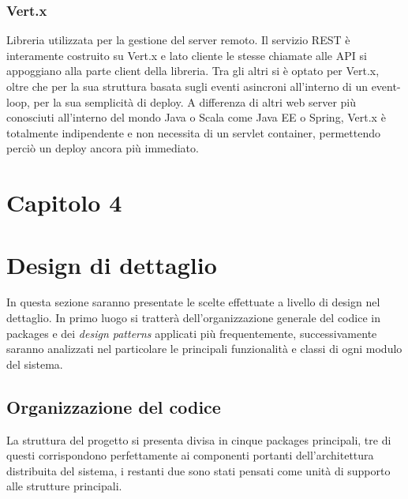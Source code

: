 	 \subsubsection{Vert.x}\label{subsub:tecnologie:vert.x}
	  Libreria utilizzata per la gestione del server remoto. Il servizio REST è interamente costruito su Vert.x e lato cliente le stesse chiamate alle API si appoggiano alla parte client della libreria.
	  Tra gli altri si è optato per Vert.x, oltre che per la sua struttura basata sugli eventi asincroni all'interno di un event-loop, per la sua semplicità di deploy. A differenza di altri web server più conosciuti all'interno del mondo Java o Scala come Java EE o Spring, Vert.x è totalmente
	  indipendente e non necessita di un servlet container, permettendo perciò un deploy ancora più immediato.
        \clearpage
        \setcounter{figure}{0}
        
\section*{\Huge {\textbf Capitolo 4}\label{chapter4}}        
    \section{Design di dettaglio}\label{sec:design:details}
     	In questa sezione saranno presentate le scelte effettuate a livello di design nel dettaglio. In primo luogo si tratterà dell'organizzazione generale del codice in packages e dei \textit{design patterns} applicati più frequentemente, successivamente saranno analizzati nel particolare le principali funzionalità e classi di ogni modulo del sistema.

         \subsection {Organizzazione del codice}\label{subsec:details:codestructure}
         La struttura del progetto si presenta divisa in cinque packages principali, tre di questi corrispondono perfettamente ai componenti portanti dell'architettura distribuita del sistema, i restanti due sono stati pensati come unità di supporto alle strutture principali.

